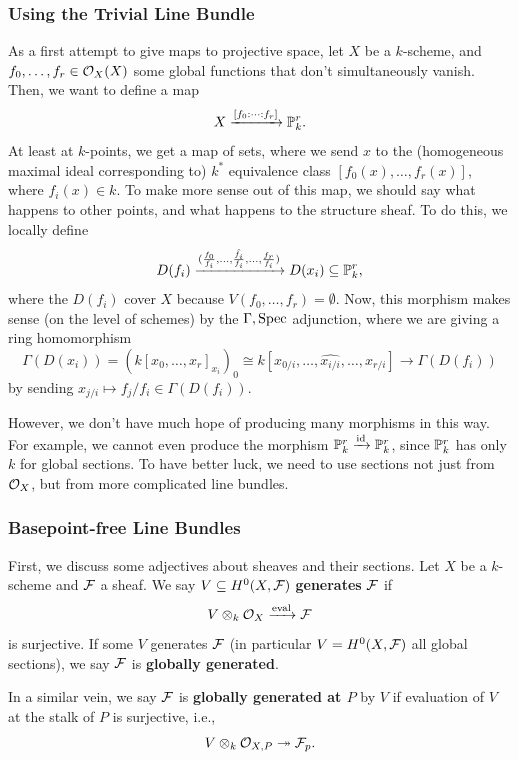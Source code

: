 \documentclass[12pt]{article}
\begin{document}
\subsubsection{Using the Trivial Line Bundle}

As a first attempt to give maps to projective space, let $X$ be a $k$-scheme, and $f_0,\dots,f_r\in \cO_X(X)$ some global functions that don't simultaneously vanish. Then, we want to define a map
\[X \xrightarrow{[f_0: \cdots : f_r]} \P^r_k.\]
At least at $k$-points, we get a map of sets, where we send $x$ to the (homogeneous maximal ideal corresponding to) $k^*$ equivalence class $[f_0(x),\dots,f_r(x)]$, where $f_i(x)\in k$. To make more sense out of this map, we should say what happens to other points, and what happens to the structure sheaf. To do this, we locally define
\[D(f_i) \xrightarrow{(\frac{f_0}{f_i}, \dots, \hat{\frac{f_i}{f_i}}, \dots, \frac{f_r}{f_i})} D(x_i) \subseteq \P^r_k,\]
where the $D(f_i)$ cover $X$ because $V(f_0,\dots,f_r)=\emptyset$. Now, this morphism makes sense (on the level of schemes) by the $\Gamma, \Spec$ adjunction, where we are giving a ring homomorphism
\[\Gamma(D(x_i)) = (k[x_0,\dots,x_r]_{x_i})_0 \cong k[x_{0/i},\dots,\hat{x_{i/i}},\dots,x_{r/i}] \longrightarrow \Gamma(D(f_i))\]
by sending $x_{j/i} \mapsto f_j/f_i \in \Gamma(D(f_i))$.

However, we don't have much hope of producing many morphisms in this way. For example, we cannot even produce the morphism $\P^r_k \xrightarrow{\id} \P^r_k$, since $\P^r_k$ has only $k$ for global sections. To have better luck, we need to use sections not just from $\cO_X$, but from more complicated line bundles.

\subsubsection{Basepoint-free Line Bundles}

First, we discuss some adjectives about sheaves and their sections. Let $X$ be a $k$-scheme and $\cF$ a sheaf. We say $V\subseteq H^0(X,\cF)$ \textbf{generates} $\cF$ if
\[V \otimes_k \cO_X \xrightarrow{\eval} \cF\]
is surjective. If some $V$ generates $\cF$ (in particular $V=H^0(X,\cF)$ all global sections), we say $\cF$ is \textbf{globally generated}.

In a similar vein, we say $\cF$ is \textbf{globally generated at $P$} by $V$ if evaluation of $V$ at the stalk of $P$ is surjective, i.e.,
\[V \otimes_k \cO_{X,P} \twoheadrightarrow \cF_p.\]
\end{document}
